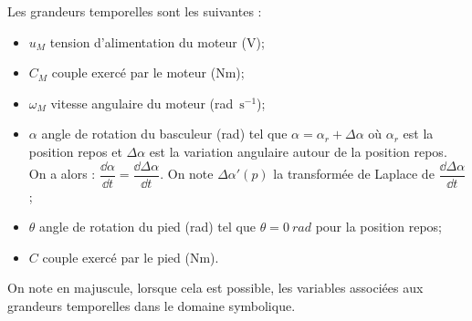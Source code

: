 \documentclass[10pt,fleqn]{article} %
\begin{document}
\begin{multicols}{2}
Les grandeurs temporelles sont les suivantes :
\begin{itemize}
\item $u_M$ tension d'alimentation du moteur (V);
\item $C_M$ couple exercé par le moteur (Nm);
\item $\omega_M$ vitesse angulaire du moteur (rad\, $\text{s}^{-1}$);
\item $\alpha$ angle de rotation du basculeur (rad) tel que $\alpha=\alpha_r+\Delta \alpha$ où $\alpha_r$ est la position repos et $\Delta \alpha$  est la variation angulaire autour de la position repos. On a alors : $\dfrac{\dd \alpha}{\dd t}=\dfrac{\dd \Delta \alpha}{\dd t}$. On note $\Delta \alpha' ( p)$ la transformée de Laplace de $\dfrac{\dd \Delta \alpha}{\dd t}$;
\item $\theta$ angle de rotation du pied (rad) tel que $\theta = \SI{0}{rad}$ pour la position repos;
\item $C$ couple exercé par le pied (Nm).
\end{itemize}
On note en majuscule, lorsque cela est possible, les variables associées aux grandeurs temporelles dans le
domaine symbolique.
%
%
%
%

\end{multicols}
\end{document}
